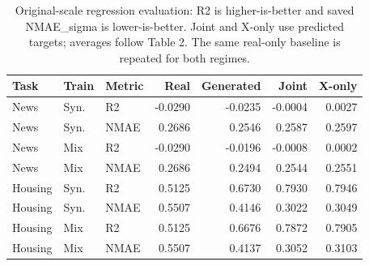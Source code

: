 \begin{table}[t]
\centering
{\small
\begin{tabular}{lllrrrr}
\toprule
Task & Train & Metric & Real & Generated & Joint & X-only \\
\midrule
News & Syn. & R2 & -0.0290 & -0.0235 & -0.0004 & 0.0027 \\
News & Syn. & NMAE & 0.2686 & 0.2546 & 0.2587 & 0.2597 \\
News & Mix & R2 & -0.0290 & -0.0196 & -0.0008 & 0.0002 \\
News & Mix & NMAE & 0.2686 & 0.2494 & 0.2544 & 0.2551 \\
Housing & Syn. & R2 & 0.5125 & 0.6730 & 0.7930 & 0.7946 \\
Housing & Syn. & NMAE & 0.5507 & 0.4146 & 0.3022 & 0.3049 \\
Housing & Mix & R2 & 0.5125 & 0.6676 & 0.7872 & 0.7905 \\
Housing & Mix & NMAE & 0.5507 & 0.4137 & 0.3052 & 0.3103 \\
\bottomrule
\end{tabular}
}
\caption{Original-scale regression evaluation: R2 is higher-is-better and saved NMAE\_sigma is lower-is-better. Joint and X-only use predicted targets; averages follow Table 2. The same real-only baseline is repeated for both regimes.}
\label{tab:regression}
\end{table}
